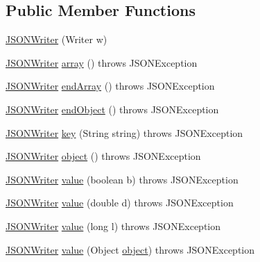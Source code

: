 \subsection*{Public Member Functions}
\begin{DoxyCompactItemize}
\item 
\hyperlink{classorg_1_1json_1_1_j_s_o_n_writer_a312dcf78fa8b46635043eb6b06184d5b}{J\-S\-O\-N\-Writer} (Writer w)
\item 
\hyperlink{classorg_1_1json_1_1_j_s_o_n_writer}{J\-S\-O\-N\-Writer} \hyperlink{classorg_1_1json_1_1_j_s_o_n_writer_aed48f7396fd364c0bc4f08b51f31afc4}{array} ()  throws J\-S\-O\-N\-Exception 
\item 
\hyperlink{classorg_1_1json_1_1_j_s_o_n_writer}{J\-S\-O\-N\-Writer} \hyperlink{classorg_1_1json_1_1_j_s_o_n_writer_a9d310d7ccc581cc070771126ee063ffe}{end\-Array} ()  throws J\-S\-O\-N\-Exception 
\item 
\hyperlink{classorg_1_1json_1_1_j_s_o_n_writer}{J\-S\-O\-N\-Writer} \hyperlink{classorg_1_1json_1_1_j_s_o_n_writer_a25cc931ef86998c61f08b1d5eff22146}{end\-Object} ()  throws J\-S\-O\-N\-Exception 
\item 
\hyperlink{classorg_1_1json_1_1_j_s_o_n_writer}{J\-S\-O\-N\-Writer} \hyperlink{classorg_1_1json_1_1_j_s_o_n_writer_ab03474f521f6fc4d8cb15d2c129fb435}{key} (String string)  throws J\-S\-O\-N\-Exception 
\item 
\hyperlink{classorg_1_1json_1_1_j_s_o_n_writer}{J\-S\-O\-N\-Writer} \hyperlink{classorg_1_1json_1_1_j_s_o_n_writer_a50ed212b9c8c9f6a57c3ddfc6bf3126a}{object} ()  throws J\-S\-O\-N\-Exception 
\item 
\hyperlink{classorg_1_1json_1_1_j_s_o_n_writer}{J\-S\-O\-N\-Writer} \hyperlink{classorg_1_1json_1_1_j_s_o_n_writer_a29441174afee5fde940c973d20e056a9}{value} (boolean b)  throws J\-S\-O\-N\-Exception 
\item 
\hyperlink{classorg_1_1json_1_1_j_s_o_n_writer}{J\-S\-O\-N\-Writer} \hyperlink{classorg_1_1json_1_1_j_s_o_n_writer_a0d9da178cbec36fc9b6e89e1d840c882}{value} (double d)  throws J\-S\-O\-N\-Exception 
\item 
\hyperlink{classorg_1_1json_1_1_j_s_o_n_writer}{J\-S\-O\-N\-Writer} \hyperlink{classorg_1_1json_1_1_j_s_o_n_writer_a5f8bdc612c2629b41420ef8e0ea94a40}{value} (long l)  throws J\-S\-O\-N\-Exception 
\item 
\hyperlink{classorg_1_1json_1_1_j_s_o_n_writer}{J\-S\-O\-N\-Writer} \hyperlink{classorg_1_1json_1_1_j_s_o_n_writer_aeab2dfdffed2e034f8598be9c89d4be1}{value} (Object \hyperlink{classorg_1_1json_1_1_j_s_o_n_writer_a50ed212b9c8c9f6a57c3ddfc6bf3126a}{object})  throws J\-S\-O\-N\-Exception 
\end{DoxyCompactItemize}
